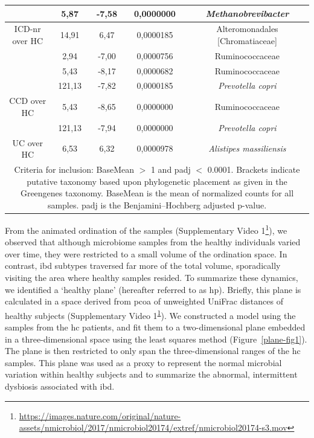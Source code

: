 \begin{table}[htbp]
{\begin{tabular}{ccccc}
&	5,87&	-7,58&	0,0000000&	\textit{Methanobrevibacter}\\
\midrule
ICD-nr over HC&	14,91&	6,47&	0,0000185&	Alteromonadales [Chromatiaceae]\\
&	2,94&	-7,00&	0,0000756&	Ruminococcaceae\\
&	5,43&	-8,17&	0,0000682&	Ruminococcaceae\\
&	121,13&	-7,82&	0,0000185&	\textit{Prevotella copri}\\
\midrule
CCD over HC&	5,43&	-8,65&	0,0000000&	Ruminococcaceae\\
&	121,13&	-7,94&	0,0000000&	\textit{Prevotella copri}\\
\midrule
UC over HC&	6,53&	6,32&	0,0000978&	\textit{Alistipes massiliensis}\\
\bottomrule
\multicolumn{5}{p{18cm}}{Criteria for inclusion: BaseMean $>$ 1 and padj $<$ 0.0001. Brackets indicate putative taxonomy based upon phylogenetic placement as given in the Greengenes taxonomy. BaseMean is the mean of normalized counts for all samples. padj is the Benjamini–Hochberg adjusted p-value.}
\end{tabular}}
\end{table}

From the animated ordination of the samples (Supplementary Video 1\footnote{\label{supVideo}\url{https://images.nature.com/original/nature-assets/nmicrobiol/2017/nmicrobiol20174/extref/nmicrobiol20174-s3.mov}}), we observed that although microbiome samples from the healthy individuals varied over time, they were restricted to a small volume of the ordination space. In contrast, \gls{ibd} subtypes traversed far more of the total volume, sporadically visiting the area where healthy samples resided. To summarize these dynamics, we identified a `healthy plane' (hereafter referred to as \gls{hp}). Briefly, this plane is calculated in a space derived from \gls{pcoa} of unweighted UniFrac distances of healthy subjects (Supplementary Video 1\textsuperscript{\ref{supVideo}}). We constructed a model using the samples from the \gls{hc} patients, and fit them to a two-dimensional plane embedded in a three-dimensional space using the least squares method (Figure~\ref{plane-fig1}). The plane is then restricted to only span the three-dimensional ranges of the \gls{hc} samples. This plane was used as a proxy to represent the normal microbial variation within healthy subjects and to summarize the abnormal, intermittent dysbiosis associated with \gls{ibd}.

